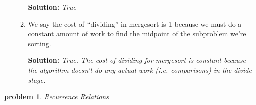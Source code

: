 \documentclass[10pt]{article}
\newtheorem{problem}{\sc\color{cit}problem}
\begin{document}
\begin{enumerate}
\begin{enumerate}
    		\textbf{Solution:} \emph{True}
    		
    		\item We say the cost of ``dividing'' in mergesort is 1 because we must do a constant amount of work to find the midpoint of the subproblem we're sorting.
    		
    		\textbf{Solution:} \emph{True. The cost of dividing for mergesort is constant because the algorithm doesn't do any actual work (i.e. comparisons) in the divide stage.}
    		
		\end{enumerate} 
    	
    \end{enumerate}    
    
    \pagebreak

\begin{problem} Recurrence Relations \end{problem}
\end{document}
